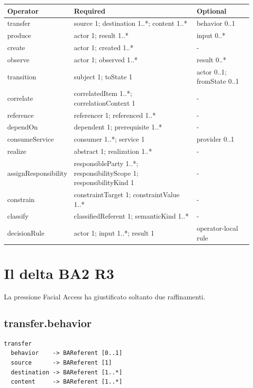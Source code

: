 \documentclass[11pt,a4paper]{article}
\begin{document}
\begin{longtable}{L{0.19\textwidth}L{0.33\textwidth}L{0.34\textwidth}}
\toprule
\textbf{Operator} & \textbf{Required} & \textbf{Optional} \\
\midrule\endhead
transfer & source 1; destination 1..*; content 1..* & behavior 0..1 \\
produce & actor 1; result 1..* & input 0..* \\
create & actor 1; created 1..* & - \\
observe & actor 1; observed 1..* & result 0..* \\
transition & subject 1; toState 1 & actor 0..1; fromState 0..1 \\
correlate & correlatedItem 1..*; correlationContext 1 & - \\
reference & referencer 1; referenced 1..* & - \\
dependOn & dependent 1; prerequisite 1..* & - \\
consumeService & consumer 1..*; service 1 & provider 0..1 \\
realize & abstract 1; realization 1..* & - \\
assignResponsibility & responsibleParty 1..*; responsibilityScope 1; responsibilityKind 1 & - \\
constrain & constraintTarget 1; constraintValue 1..* & - \\
classify & classifiedReferent 1; semanticKind 1..* & - \\
decisionRule & actor 1; input 1..*; result 1 & operator-local rule \\
\bottomrule
\end{longtable}

\section{Il delta BA2 R3}

La pressione Facial Access ha giustificato soltanto due raffinamenti.

\subsection{transfer.behavior}

\begin{lstlisting}
transfer
  behavior    -> BAReferent [0..1]
  source      -> BAReferent [1]
  destination -> BAReferent [1..*]
  content     -> BAReferent [1..*]
\end{lstlisting}
\end{document}
